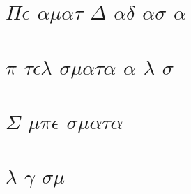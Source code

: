 \documentclass{article}
\begin{document}
\chapter{$\Pi$$\epsilon$ $\alpha$$\mu$$\alpha$$\tau$  $\Delta$ $\alpha$$\delta$ $\alpha$$\sigma$ $\alpha$}


\chapter{ $\pi$ $\tau$$\epsilon$$\lambda$ $\sigma$$\mu$$\alpha$$\tau$$\alpha$  $\alpha$   $\lambda$ $\sigma$ }


\chapter{$\Sigma$ $\mu$$\pi$$\epsilon$ $\sigma$$\mu$$\alpha$$\tau$$\alpha$}





\chapter{  $\lambda$ $\gamma$ $\sigma$$\mu$ }

\end{document}
